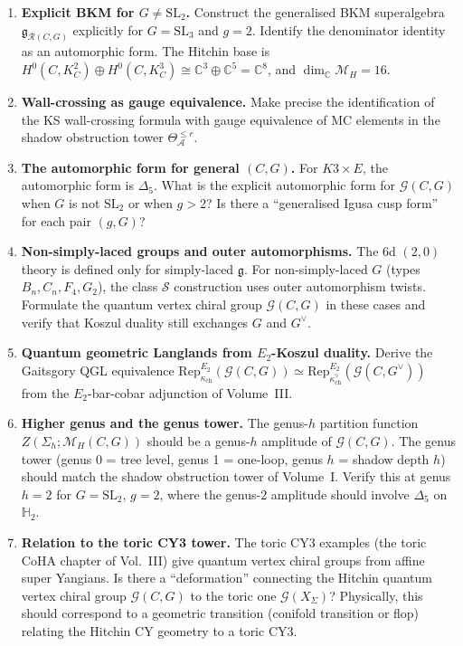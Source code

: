 \documentclass[11pt]{article}
\theoremstyle{definition}
\theoremstyle{remark}
\newcommand{\Rep}{\mathrm{Rep}}
\newcommand{\frakg}{\mathfrak{g}}
\newcommand{\cA}{\mathcal{A}}
\newcommand{\cM}{\mathcal{M}}
\newcommand{\Etwo}{E_2}
\begin{document}
\begin{enumerate}[label=\textbf{OP\arabic*.}]
 \item \textbf{Explicit BKM for $G \neq \mathrm{SL}_2$.} Construct the generalised BKM superalgebra $\frakg_{\mathcal{R}(C,G)}$ explicitly for $G = \mathrm{SL}_3$ and $g = 2$. Identify the denominator identity as an automorphic form. The Hitchin base is $H^0(C, K_C^2) \oplus H^0(C, K_C^3) \cong \mathbb{C}^3 \oplus \mathbb{C}^5 = \mathbb{C}^8$, and $\dim_\mathbb{C} \cM_H = 16$.

 \item \textbf{Wall-crossing as gauge equivalence.} Make precise the identification of the KS wall-crossing formula with gauge equivalence of MC elements in the shadow obstruction tower $\Theta_\cA^{\leq r}$.

 \item \textbf{The automorphic form for general $(C, G)$.} For $K3 \times E$, the automorphic form is $\Delta_5$. What is the explicit automorphic form for $\mathcal{G}(C, G)$ when $G$ is not $\mathrm{SL}_2$ or when $g > 2$? Is there a ``generalised Igusa cusp form'' for each pair $(g, G)$?

 \item \textbf{Non-simply-laced groups and outer automorphisms.} The 6d $(2,0)$ theory is defined only for simply-laced $\frakg$. For non-simply-laced $G$ (types $B_n, C_n, F_4, G_2$), the class $\mathcal{S}$ construction uses outer automorphism twists. Formulate the quantum vertex chiral group $\mathcal{G}(C, G)$ in these cases and verify that Koszul duality still exchanges $G$ and $G^\vee$.

 \item \textbf{Quantum geometric Langlands from $\Etwo$-Koszul duality.} Derive the Gaitsgory QGL equivalence $\Rep^{\Etwo}_{\kappa_{\mathrm{ch}}}(\mathcal{G}(C, G)) \simeq \Rep^{\Etwo}_{\kappa_{\mathrm{ch}}^\vee}(\mathcal{G}(C, G^\vee))$ from the $\Etwo$-bar-cobar adjunction of Volume~III.

 \item \textbf{Higher genus and the genus tower.} The genus-$h$ partition function $Z(\Sigma_h; \cM_H(C, G))$ should be a genus-$h$ amplitude of $\mathcal{G}(C, G)$. The genus tower (genus 0 = tree level, genus 1 = one-loop, genus $h$ = shadow depth $h$) should match the shadow obstruction tower of Volume~I. Verify this at genus $h = 2$ for $G = \mathrm{SL}_2$, $g = 2$, where the genus-2 amplitude should involve $\Delta_5$ on $\mathbb{H}_2$.

 \item \textbf{Relation to the toric CY3 tower.} The toric CY3 examples (the toric CoHA chapter of Vol.~III) give quantum vertex chiral groups from affine super Yangians. Is there a ``deformation'' connecting the Hitchin quantum vertex chiral group $\mathcal{G}(C, G)$ to the toric one $\mathcal{G}(X_\Sigma)$? Physically, this should correspond to a geometric transition (conifold transition or flop) relating the Hitchin CY geometry to a toric CY3.


\end{enumerate}
\end{document}
